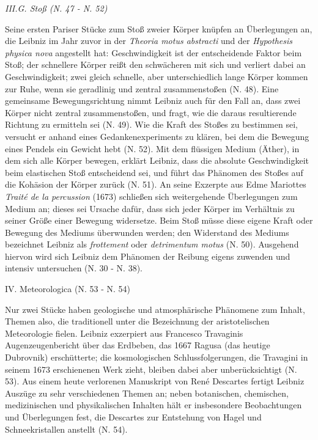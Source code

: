 \par
\par\vspace{2.0ex}
\noindent
\textit{III.G. Sto{\ss} (N. 47 - N. 52)}
\par\noindent
Seine ersten Pariser Stücke zum Sto{\ss} zweier Körper knüpfen an Überlegungen an, die Leibniz im Jahr zuvor in der \textit{Theoria motus abstracti} und der \textit{Hypothesis physica nova} angestellt hat: Geschwindigkeit ist der entscheidende Faktor beim Sto{\ss}; der schnellere Körper rei{\ss}t den schwächeren mit sich und verliert dabei an Geschwindigkeit; zwei gleich schnelle, aber unterschiedlich lange Körper kommen zur Ruhe, wenn sie geradlinig und zentral zusammensto{\ss}en (N. 48). Eine gemeinsame Bewegungsrichtung nimmt Leibniz auch für den Fall an, dass zwei Körper nicht zentral zusammensto{\ss}en, und fragt, wie die daraus resultierende Richtung zu ermitteln sei (N. 49). Wie die Kraft des Sto{\ss}es zu bestimmen sei, versucht er anhand eines Gedankenexperiments zu klären, bei dem die Bewegung eines Pendels ein Gewicht hebt (N. 52). Mit dem flüssigen Medium (Äther), in dem sich alle Körper bewegen, erklärt Leibniz, dass die absolute Geschwindigkeit beim elastischen Sto{\ss} entscheidend sei, und führt das Phänomen des Sto{\ss}es auf die Kohäsion der Körper zurück (N. 51). An seine Exzerpte aus Edme Mariottes \textit{Traité de la percussion} (1673) schlie{\ss}en sich weitergehende Überlegungen zum Medium an; dieses sei Ursache dafür, dass sich jeder Körper im Verhältnis zu seiner Grö{\ss}e einer Bewegung widersetze. Beim Sto{\ss} müsse diese eigene Kraft oder Bewegung des Mediums überwunden werden; den Widerstand des Mediums bezeichnet Leibniz als \textit{frottement} oder \textit{detrimentum motus} (N. 50). Ausgehend hiervon wird sich Leibniz dem Phänomen der Reibung eigens zuwenden und intensiv untersuchen (N. 30 - N. 38). 
\par
\vspace{3.0ex}
\noindent
IV. Meteorologica (N. 53 - N. 54)
\vspace{1.0ex}
\par\noindent
Nur zwei Stücke haben geologische und atmosphärische Phänomene zum Inhalt, Themen also, die traditionell unter die Bezeichnung der aristotelischen Meteorologie fielen. Leibniz exzerpiert aus Francesco Travaginis Augenzeugenbericht über das Erdbeben, das 1667 Ragusa (das heutige Dubrovnik) erschütterte; die kosmologischen Schlussfolgerungen, die Travagini in seinem 1673 erschienenen Werk zieht, bleiben dabei aber unberücksichtigt (N. 53). Aus einem heute verlorenen Manuskript von René Descartes fertigt Leibniz Auszüge zu sehr verschiedenen Themen an; neben botanischen, chemischen, medizinischen und physikalischen Inhalten hält er insbesondere Beobachtungen und Überlegungen fest, die Descartes zur Entstehung von Hagel und Schneekristallen anstellt (N. 54). 
